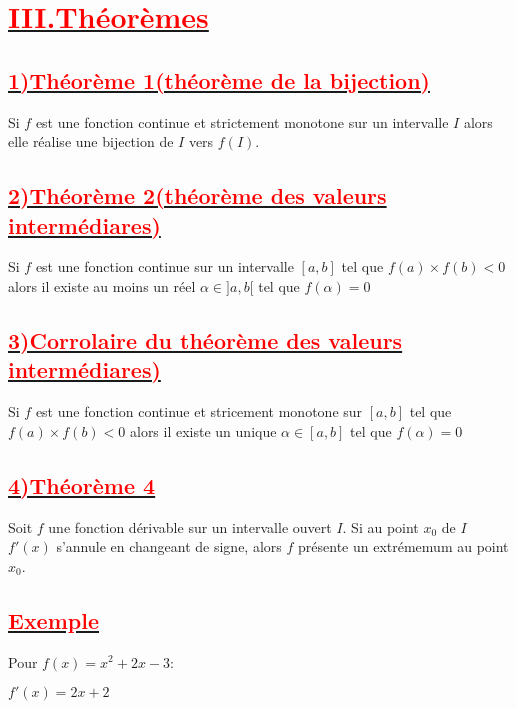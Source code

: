 \documentclass[12pt]{article}
\begin{document}
\section*{\underline{\textbf{\textcolor{red}{III.Théorèmes}}}}
\subsection*{\underline{\textbf{\textcolor{red}{1)Théorème 1(théorème de la bijection)}}}}
Si $f$ est une fonction continue et strictement monotone sur un intervalle $I$ alors elle réalise une bijection de $I$ vers $f(I)$.
\subsection*{\underline{\textbf{\textcolor{red}{2)Théorème 2(théorème des valeurs intermédiares)}}}}
Si $f$ est une fonction continue sur un intervalle $[a, b]$ tel que $f(a)\times f(b)<0$ alors il existe au moins un réel $\alpha\in ]a, b[$ tel que $f(\alpha)=0$
\subsection*{\underline{\textbf{\textcolor{red}{3)Corrolaire du théorème des valeurs intermédiares)}}}}
Si $f$ est une fonction continue et stricement monotone sur $[a, b]$ tel que $f(a)\times f(b)<0$ alors il existe un unique $\alpha\in [a, b]$ tel que $f(\alpha)=0$
\subsection*{\underline{\textbf{\textcolor{red}{4)Théorème 4}}}}
Soit $f$ une fonction dérivable sur un intervalle ouvert $I$. Si au point $x_{0}$ de $I$ $f'(x)$ s'annule en changeant de signe, alors $f$ présente un extrémemum au point $x_{0}$.
\subsection*{\underline{\textbf{\textcolor{red}{Exemple}}}} 
Pour $f(x)=x^{2}+2x-3$:

$f'(x)=2x+2$
\end{document}
